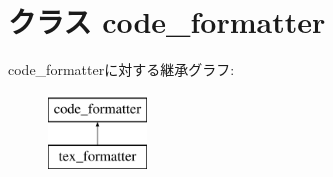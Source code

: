 \hypertarget{classm5_1_1util_1_1code__formatter_1_1code__formatter}{
\section{クラス code\_\-formatter}
\label{classm5_1_1util_1_1code__formatter_1_1code__formatter}
}
code\_\-formatterに対する継承グラフ:\begin{figure}[H]
\begin{center}
\leavevmode
\includegraphics[height=2cm]{classm5_1_1util_1_1code__formatter_1_1code__formatter}
\end{center}
\end{figure}
